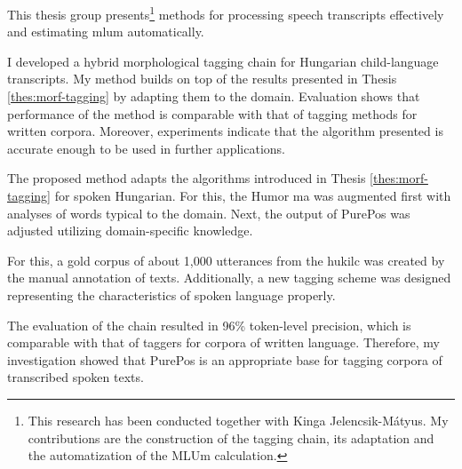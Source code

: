This thesis group presents\footnote{This research has been conducted together with Kinga Jelencsik-Mátyus. 
My contributions are the construction of the tagging chain, its adaptation and the automatization of the MLUm calculation.} methods for processing speech transcripts effectively and estimating \acrlong{mlum} automatically.


\begin{core}
\begin{thesis}
\label{thes:spoken-morf-tagging}
I developed a hybrid morphological tagging chain for Hungarian child-language transcripts.
My method builds on top of the results presented in Thesis \ref{thes:morf-tagging} by adapting them to the domain.
Evaluation shows that performance of the method is comparable with that of tagging methods for written corpora.
Moreover, experiments indicate that the algorithm presented is accurate enough to be used in further applications.
\end{thesis}

\begin{pub}
\cite{Matyus2014,Orosz2014c}
\end{pub}
\end{core}

The proposed method adapts the algorithms introduced in Thesis \ref{thes:morf-tagging} for spoken Hungarian.
For this, the Humor \acrlong{ma} was augmented first with analyses of words typical to the domain.
Next, the output of PurePos was adjusted utilizing domain-specific knowledge.

For this, a gold corpus of about 1,000 utterances from the \acrshort{hukilc} was created by the manual annotation of texts. 
Additionally, a new tagging scheme was designed representing the characteristics of spoken language properly.

The evaluation of the chain resulted in 96\% token-level precision, which is comparable with that of taggers for corpora of written language.
Therefore, my investigation showed that PurePos is an appropriate base for tagging corpora of transcribed spoken texts.

\thesisline%


